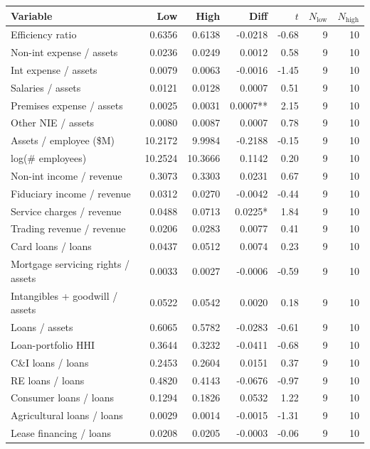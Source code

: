 \begin{tabular}{lrrrrrr}
\toprule
Variable & Low & High & Diff & $t$ & $N_{\text{low}}$ & $N_{\text{high}}$ \\
\midrule
Efficiency ratio & 0.6356 & 0.6138 & -0.0218 & -0.68 & 9 & 10 \\
Non-int expense / assets & 0.0236 & 0.0249 & 0.0012 & 0.58 & 9 & 10 \\
Int expense / assets & 0.0079 & 0.0063 & -0.0016 & -1.45 & 9 & 10 \\
Salaries / assets & 0.0121 & 0.0128 & 0.0007 & 0.51 & 9 & 10 \\
Premises expense / assets & 0.0025 & 0.0031 & 0.0007** & 2.15 & 9 & 10 \\
Other NIE / assets & 0.0080 & 0.0087 & 0.0007 & 0.78 & 9 & 10 \\
Assets / employee (\$M) & 10.2172 & 9.9984 & -0.2188 & -0.15 & 9 & 10 \\
log(\# employees) & 10.2524 & 10.3666 & 0.1142 & 0.20 & 9 & 10 \\
Non-int income / revenue & 0.3073 & 0.3303 & 0.0231 & 0.67 & 9 & 10 \\
Fiduciary income / revenue & 0.0312 & 0.0270 & -0.0042 & -0.44 & 9 & 10 \\
Service charges / revenue & 0.0488 & 0.0713 & 0.0225* & 1.84 & 9 & 10 \\
Trading revenue / revenue & 0.0206 & 0.0283 & 0.0077 & 0.41 & 9 & 10 \\
Card loans / loans & 0.0437 & 0.0512 & 0.0074 & 0.23 & 9 & 10 \\
Mortgage servicing rights / assets & 0.0033 & 0.0027 & -0.0006 & -0.59 & 9 & 10 \\
Intangibles + goodwill / assets & 0.0522 & 0.0542 & 0.0020 & 0.18 & 9 & 10 \\
Loans / assets & 0.6065 & 0.5782 & -0.0283 & -0.61 & 9 & 10 \\
Loan-portfolio HHI & 0.3644 & 0.3232 & -0.0411 & -0.68 & 9 & 10 \\
C\&I loans / loans & 0.2453 & 0.2604 & 0.0151 & 0.37 & 9 & 10 \\
RE loans / loans & 0.4820 & 0.4143 & -0.0676 & -0.97 & 9 & 10 \\
Consumer loans / loans & 0.1294 & 0.1826 & 0.0532 & 1.22 & 9 & 10 \\
Agricultural loans / loans & 0.0029 & 0.0014 & -0.0015 & -1.31 & 9 & 10 \\
Lease financing / loans & 0.0208 & 0.0205 & -0.0003 & -0.06 & 9 & 10 \\

\end{tabular}
